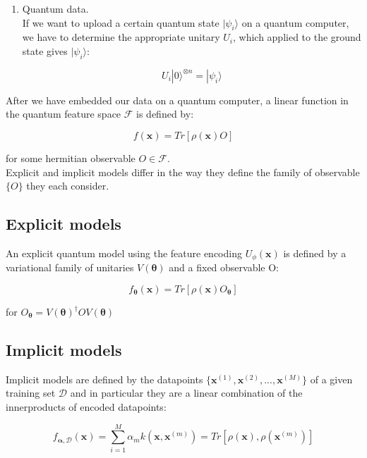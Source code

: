 \begin{enumerate}
    \item Quantum data.\\
    If we want to upload a certain quantum state $|\psi_i\rangle$ on a quantum computer, we have to determine
    the appropriate unitary $U_i$, which applied to the ground state gives $|\psi_i\rangle$:
    
    \begin{equation}
        U_i |0\rangle^{\otimes n} = |\psi_i\rangle
    \end{equation}
\end{enumerate}

After we have embedded our data on a quantum computer, a linear function in the quantum feature space 
$\mathcal{F}$ is defined by:

\begin{equation}
    f(\bm{x}) = Tr[\rho(\bm{x})O]
\end{equation}

for some hermitian observable $O \in \mathcal{F}$.\\
Explicit and implicit models differ in the way they define the family of observable 
$\{ O \}$ they each consider.

\subsection{Explicit models}

An explicit quantum model using the feature encoding $U_{\phi}(\bm{x})$ is defined by a variational 
family of unitaries $V(\bm{\theta})$ and a fixed observable O:

\begin{equation}
    f_{\bm{\theta}}(\bm{x}) = Tr[\rho(\bm{x})O_{\bm{\theta}}]
\end{equation}

for $O_{\bm{\theta}} = V(\bm{\theta})^{\dagger} O V(\bm{\theta})$

\subsection{Implicit models}

Implicit models are defined by the datapoints $\{ \bm{x}^{(1)}, \bm{x}^{(2)}, ..., \bm{x}^{(M)} \}$ of a given training set
$\mathcal{D}$ and in particular they are a linear combination of the innerproducts of encoded datapoints:

\begin{equation}
    f_{\bm{\alpha}, \mathcal{D}}(\bm{x}) = \sum_{i=1}^M \alpha_m k(\bm{x}, \bm{x}^{(m)}) = Tr[\rho(\bm{x}), \rho(\bm{x}^{(m)})]
\end{equation}


